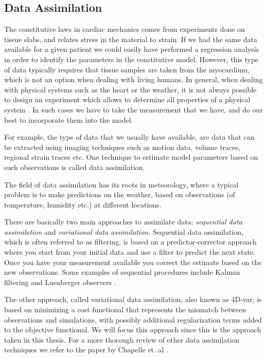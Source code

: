 \subsection{Data Assimilation}
The constitutive laws in cardiac mechanics comes from experiments
done on tissue slabs, and relates stress in the material to strain.
If we had the same data available for a given patient we could easily
have performed a regression analysis in order to identify the
parameters in the constitutive model. However, this type of data
typically requires that tissue samples are taken from the myocardium,
which is not an option when dealing with living humans. In general,
when dealing with physical systems such as the heart or the weather,
it is not always possible to design an experiment which
allows to determine all properties of a physical system
\cite{chapelle2013fundamental}. In such cases we have to take the
measurement that we have, and do our best to incorporate them into the
model. 

For example, the type of data that we usually have available, are data
that can be extracted using imaging techniques such as motion data,
volume traces, regional strain traces etc. One technique to estimate
model parameters based on such observations is called data assimilation.


The field of data assimilation has its roots in meteorology, where
a typical problem is to make predictions on the weather, based on
observations (of temperature, humidity etc.) at different locations. 


There are basically two main approaches to assimilate data;
\emph{sequential data assimilation} and \emph{variational data
  assimilation}. Sequential data assimilation, which is often
referred to as filtering, is based on a predictor-corrector approach
where you start from your initial data and use a filter to predict the
next state. Once you have your measurement available you correct the
estimate based on the new observations. Some examples of sequential
procedures include Kalman filtering and Luenberger observers
\cite{chapelle2013fundamental}.

The other approach, called variational data assimilation, also known as
4D-var, is based on minimizing a cost functional that
represents the mismatch between observations and simulations, with
possibly additional regularization terms added to the objective
functional. We will focus this approach since this is the approach
taken in this thesis. For a more thorough review of other
data assimilation techniques we refer to the paper by Chapelle
et. al \cite{chapelle2013fundamental}.


